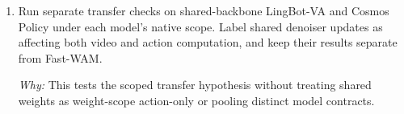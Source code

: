 \documentclass[10pt,a4paper]{article}
\begin{document}
\begin{enumerate}[leftmargin=*,start=5]
\par\emph{Why:} Command fidelity, task completion, and deployed latency answer different questions. \(`V_{visit}`\) is a fixed-reference diagnostic and an empirical moderator hypothesis, not proof of benefit. The Phase4 clarification does not pass the earlier gate;\allowbreak{} post\_revision status remains FAILED VALIDATION.
  \item Run separate transfer checks on shared-backbone LingBot-VA and Cosmos Policy under each model's native scope. Label shared denoiser updates as affecting both video and action computation, and keep their results separate from Fast-WAM.
\par\emph{Why:} This tests the scoped transfer hypothesis without treating shared weights as weight-scope action-only or pooling distinct model contracts.
\end{enumerate}
\end{document}
